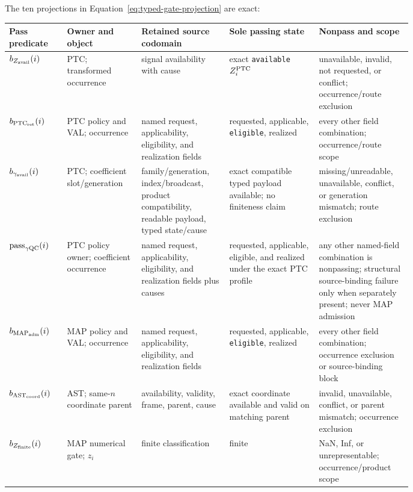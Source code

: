 \documentclass[10pt]{article}
\newcommand{\code}[1]{\nolinkurl{#1}}
\begin{document}
\SCIMapObservationEquations

The ten projections in Equation~\eqref{eq:typed-gate-projection} are exact:

\clearpage
{\footnotesize
\begin{longtable}{L{0.11\linewidth}L{0.15\linewidth}L{0.17\linewidth}L{0.19\linewidth}L{0.16\linewidth}}
\toprule
Pass predicate & Owner and object & Retained source codomain & Sole passing state & Nonpass and scope\\
\midrule
\(b_{Z_{\rm avail}}(i)\) & PTC; transformed occurrence & signal availability with cause & exact \code{available} \(Z_i^{\rm PTC}\) & unavailable, invalid, not requested, or conflict; occurrence/route exclusion\\
\(b_{{\rm PTC}_{\rm ret}}(i)\) & PTC policy and VAL; occurrence & named request, applicability, eligibility, and realization fields & requested, applicable, \code{eligible}, realized & every other field combination; occurrence/route scope\\
\(b_{\gamma_{\rm avail}}(i)\) & PTC; coefficient slot/generation & family/generation, index/broadcast, product compatibility, readable payload, typed state/cause & exact compatible typed payload available; no finiteness claim & missing/unreadable, unavailable, conflict, or generation mismatch; route exclusion\\
\(\mathrm{pass}_{\gamma{\rm QC}}(i)\) & PTC policy owner; coefficient occurrence & named request, applicability, eligibility, and realization fields plus causes & requested, applicable, eligible, and realized under the exact PTC profile & any other named-field combination is nonpassing; structural source-binding failure only when separately present; never MAP admission\\
\(b_{{\rm MAP}_{\rm adm}}(i)\) & MAP policy and VAL; occurrence & named request, applicability, eligibility, and realization fields & requested, applicable, \code{eligible}, realized & every other field combination; occurrence exclusion or source-binding block\\
\(b_{{\rm AST}_{\rm coord}}(i)\) & AST; same-\(n\) coordinate parent & availability, validity, frame, parent, cause & exact coordinate available and valid on matching parent & invalid, unavailable, conflict, or parent mismatch; occurrence exclusion\\
\(b_{Z_{\rm finite}}(i)\) & MAP numerical gate; \(z_i\) & finite classification & finite & NaN, Inf, or unrepresentable; occurrence/product scope\\

\end{longtable}}
\end{document}

